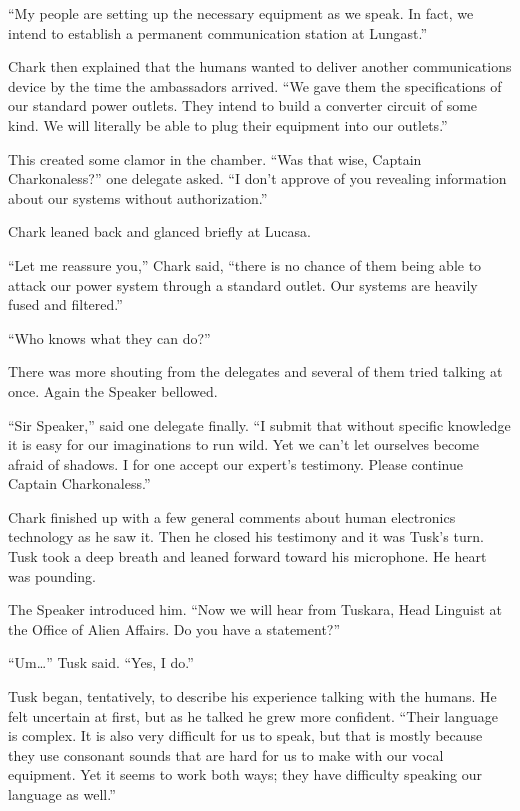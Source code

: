``My people are setting up the necessary equipment as we speak. In fact, we intend to establish
a permanent communication station at Lungast.''

Chark then explained that the humans wanted to deliver another communications device by the time
the ambassadors arrived. ``We gave them the specifications of our standard power outlets. They
intend to build a converter circuit of some kind. We will literally be able to plug their
equipment into our outlets.''

This created some clamor in the chamber. ``Was that wise, Captain Charkonaless?'' one delegate
asked. ``I don't approve of you revealing information about our systems without authorization.''

Chark leaned back and glanced briefly at Lucasa.

``Let me reassure you,'' Chark said, ``there is no chance of them being able to attack our power
system through a standard outlet. Our systems are heavily fused and filtered.''

``Who knows what they can do?''

There was more shouting from the delegates and several of them tried talking at once. Again the
Speaker bellowed.

``Sir Speaker,'' said one delegate finally. ``I submit that without specific knowledge it is
easy for our imaginations to run wild. Yet we can't let ourselves become afraid of shadows. I
for one accept our expert's testimony. Please continue Captain Charkonaless.''

Chark finished up with a few general comments about human electronics technology as he saw it.
Then he closed his testimony and it was Tusk's turn. Tusk took a deep breath and leaned forward
toward his microphone. He heart was pounding.

The Speaker introduced him. ``Now we will hear from Tuskara, Head Linguist at the Office of
Alien Affairs. Do you have a statement?''

``Um\ldots'' Tusk said. ``Yes, I do.''

Tusk began, tentatively, to describe his experience talking with the humans. He felt uncertain
at first, but as he talked he grew more confident. ``Their language is complex. It is also very
difficult for us to speak, but that is mostly because they use consonant sounds that are hard
for us to make with our vocal equipment. Yet it seems to work both ways; they have difficulty
speaking our language as well.''

